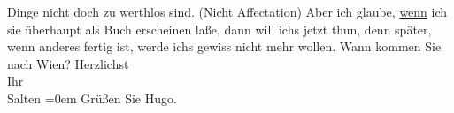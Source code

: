 \begin{ledgroupsized}[t]{13cm}
               Dinge nicht doch zu werthlos sind. (Nicht Affectation) Aber ich glaube, \uline{wenn} ich sie überhaupt als Buch erscheinen laße, dann
               will ichs jetzt thun, denn später, wenn anderes fertig ist, {\pb}werde ichs gewiss nicht mehr
               wollen. \pend
           \pstart
           Wann kommen Sie nach Wien? \pend
           \pstart
           Herzlichst {\\[\baselineskip]}Ihr {\\[\baselineskip]}\spacefill\mbox{Salten}\pend
           \leftskip=0em{}\pstart
           \noindent{}Grüßen Sie Hugo.\pend
           
         
         \endnumbering{}\end{ledgroupsized}\begin{anhang}\end{anhang}\newcommand{\dateiname}{L03299}\newcommand{\titel}{Felix Salten an Arthur Schnitzler, [29. 8. 1899]}\newcommand{\editorInnen}{Martin Anton Müller und Laura Untner}
      